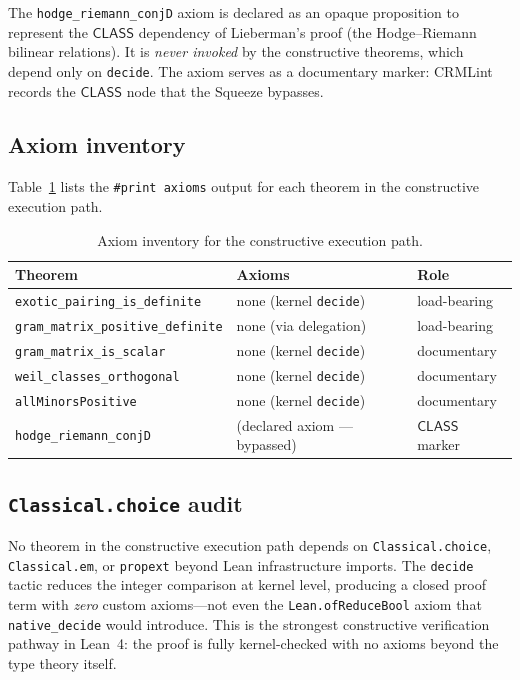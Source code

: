 \documentclass[11pt]{article}
\theoremstyle{plain}
\theoremstyle{definition}
\theoremstyle{remark}
\newcommand{\CLASS}{\mathsf{CLASS}}
\begin{document}
\noindent The \texttt{hodge\_riemann\_conjD} axiom is declared as an opaque
proposition to represent the $\CLASS$ dependency of Lieberman's proof
(the Hodge--Riemann bilinear relations).  It is \emph{never invoked} by
the constructive theorems, which depend only on \texttt{decide}.
The axiom serves as a documentary marker: CRMLint records the $\CLASS$
node that the Squeeze bypasses.

\subsection{Axiom inventory}

Table~\ref{tab:axioms} lists the \texttt{\#print axioms} output for each
theorem in the constructive execution path.

\begin{table}[ht]
\centering
\caption{Axiom inventory for the constructive execution path.}
\label{tab:axioms}
\begin{tabular}{lll}
\toprule
\textbf{Theorem} & \textbf{Axioms} & \textbf{Role} \\
\midrule
\texttt{exotic\_pairing\_is\_definite}
  & none (kernel \texttt{decide}) & load-bearing \\
\texttt{gram\_matrix\_positive\_definite}
  & none (via delegation) & load-bearing \\
\texttt{gram\_matrix\_is\_scalar}
  & none (kernel \texttt{decide}) & documentary \\
\texttt{weil\_classes\_orthogonal}
  & none (kernel \texttt{decide}) & documentary \\
\texttt{allMinorsPositive}
  & none (kernel \texttt{decide}) & documentary \\
\texttt{hodge\_riemann\_conjD}
  & (declared axiom --- bypassed) & $\CLASS$ marker \\
\bottomrule
\end{tabular}
\end{table}

\subsection{\texttt{Classical.choice} audit}

No theorem in the constructive execution path depends on
\texttt{Classical.choice}, \texttt{Classical.em}, or \texttt{propext}
beyond Lean infrastructure imports.  The \texttt{decide} tactic reduces
the integer comparison at kernel level, producing a closed proof term
with \emph{zero} custom axioms---not even the \texttt{Lean.ofReduceBool}
axiom that \texttt{native\_decide} would introduce.  This is the strongest
constructive verification pathway in Lean~4: the proof is fully
kernel-checked with no axioms beyond the type theory itself.
\end{document}

